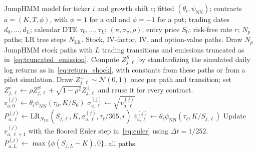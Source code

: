 \begin{algorithm}[H]
\caption{Forward simulation of contract values under the full factor; the other IV variants change only the factor update}\label{alg:forward_sim}
\begin{algorithmic}[1]
\Require JumpHMM model for ticker $i$ and growth shift $c$; fitted $(\theta_i,\psi_{\mathrm{NN}})$; contracts $a=(K,T,\phi)$, with $\phi=1$ for a call and $\phi=-1$ for a put; trading dates $d_0,\ldots,d_L$; calendar DTE $\tau_0,\ldots,\tau_L$; $(\kappa,\sigma_v,\rho)$; entry price $S_0$; risk-free rate $r$; $N_p$ paths; LR tree steps $N_{\mathrm{LR}}$.
\Ensure Stock, IV-factor, IV, and option-value paths.
\State Draw $N_p$ JumpHMM stock paths with $L$ trading transitions and emissions truncated as in~\eqref{eq:truncated_emission}.
\State Compute $Z^S_{j,\ell}$ by standardizing the simulated daily log returns as in~\eqref{eq:return_shock}, with constants from these paths or from a pilot simulation.
\State Draw $Z^\perp_{j,\ell}\sim\mathcal N(0,1)$ once per path and transition; set $Z^v_{j,\ell}\gets\rho Z^S_{j,\ell}+\sqrt{1-\rho^2}Z^\perp_{j,\ell}$ and reuse it for every contract.
  \State $v_{a,0}^{(j)} \gets \theta_i\psi_{\mathrm{NN}}(\tau_0,K/S_0)$
    \State $\sigma_{a,\ell}^{(j)} \gets \sqrt{v_{a,\ell}^{(j)}}$
    \State $P_{a,\ell}^{(j)} \gets \mathrm{LR}_{N_{\mathrm{LR}}}(S_{j,\ell},K,\sigma_{a,\ell}^{(j)},\tau_\ell/365,r)$
    \State $\bar v_{a,\ell}^{(j)}\gets\theta_i\psi_{\mathrm{NN}}(\tau_\ell,K/S_{j,\ell})$
    \State Update $v_{a,\ell+1}^{(j)}$ with the floored Euler step in~\eqref{eq:euler} using $\Delta t=1/252$.
  \EndFor
  \State $P_{a,L}^{(j)}\gets\max\{\phi(S_{j,L}-K),0\}$.
\EndFor
\State \Return all paths.
\end{algorithmic}
\end{algorithm}

